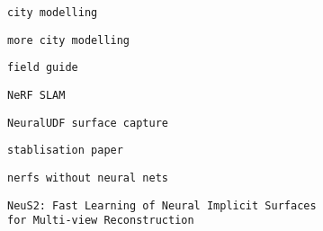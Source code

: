         \protect\hypertarget{ID_1968508676}{}{}

\begin{verbatim}
city modelling
\end{verbatim}
       

       
       
        \protect\hypertarget{ID_1636928173}{}{}

\begin{verbatim}
more city modelling
\end{verbatim}
       

       
       
        \protect\hypertarget{ID_1341826905}{}{}

\begin{verbatim}
field guide
\end{verbatim}
       

       
       
        \protect\hypertarget{ID_1344970588}{}{}

\begin{verbatim}
NeRF SLAM
\end{verbatim}
       

       
       
        \protect\hypertarget{ID_1803867972}{}{}

\begin{verbatim}
NeuralUDF surface capture
\end{verbatim}
       

       
       
        \protect\hypertarget{ID_794256628}{}{}

\begin{verbatim}
stablisation paper
\end{verbatim}
       

       
       
        \protect\hypertarget{ID_504370686}{}{}

\begin{verbatim}
nerfs without neural nets
\end{verbatim}
       

       
       
        \protect\hypertarget{ID_1225680097}{}{}

\begin{verbatim}
NeuS2: Fast Learning of Neural Implicit Surfaces
for Multi-view Reconstruction
\end{verbatim}
       


